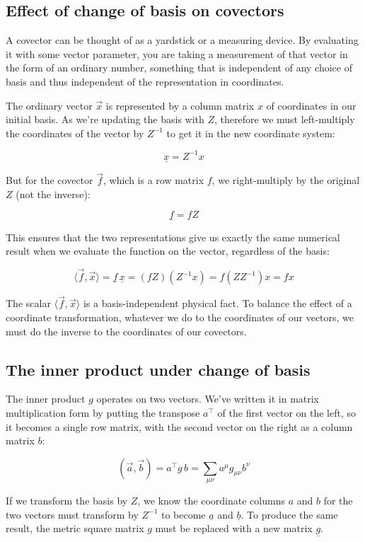 \subsection{Effect of change of basis on covectors} \label{sec:vector-grow-shrink}

A covector can be thought of as a yardstick or a measuring device. By evaluating it with some vector parameter, you are taking a measurement of that vector in the form of an ordinary number, something that is independent of any choice of basis and thus independent of the representation in coordinates.

The ordinary vector $\vec{x}$ is represented by a column matrix $x$ of coordinates in our initial basis. As we're updating the basis with $Z$, therefore we must left-multiply the coordinates of the vector by $Z^{-1}$ to get it in the new coordinate system:

$$
\underline{x} = Z^{-1} x
$$

But for the covector $\vec{f}$, which is a row matrix $f$, we right-multiply by the original $Z$ (not the inverse):

$$
\underline{f} = f Z
$$

This ensures that the two representations give us exactly the same numerical result when we evaluate the function on the vector, regardless of the basis:

$$
\langle \vec{f}, \vec{x} \rangle = \underline{f} \, \underline{x} = (f Z) (Z^{-1} x) = f (Z Z^{-1}) x = fx
$$

The scalar $\langle \vec{f}, \vec{x} \rangle$ is a basis-independent physical fact. To balance the effect of a coordinate transformation, whatever we do to the coordinates of our vectors, we must do the inverse to the coordinates of our covectors.

\subsection{The inner product under change of basis}

The inner product $g$ operates on two vectors. We've written it in matrix multiplication form by putting the transpose $a^\intercal$ of the first vector on the left, so it becomes a single row matrix, with the second vector on the right as a column matrix $b$:

$$
(\vec{a}, \vec{b}) = a^\intercal g\, b = \sum_{\mu\nu} a^{\mu} g_{\mu\nu} b^{\nu}
$$

If we transform the basis by $Z$, we know the coordinate columns $a$ and $b$ for the two vectors must transform by $Z^{-1}$ to become $\underline{a}$ and $\underline{b}$. To produce the same result, the metric square matrix $g$ must be replaced with a new matrix $\underline{g}$. 

